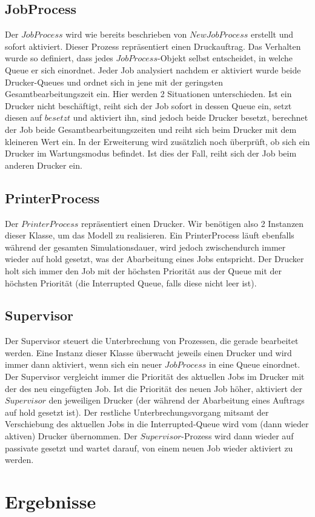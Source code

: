 \documentclass[12pt,a4paper]{article}
\begin{document}
	\subsection{JobProcess}
	Der $JobProcess$ wird wie bereits beschrieben von $NewJobProcess$ erstellt und sofort aktiviert. Dieser Prozess repräsentiert einen Druckauftrag. Das Verhalten wurde so definiert, dass jedes
	$JobProcess$-Objekt selbst entscheidet, in welche Queue er sich einordnet. Jeder Job analysiert nachdem er aktiviert wurde beide Drucker-Queues und ordnet sich in jene mit der geringsten
	Gesamtbearbeitungszeit ein. Hier werden 2 Situationen unterschieden. Ist ein Drucker nicht beschäftigt, reiht sich der Job sofort in dessen Queue ein, setzt diesen auf $besetzt$ und aktiviert ihn, sind 
	jedoch beide Drucker besetzt, berechnet der Job beide Gesamtbearbeitungszeiten und reiht sich beim Drucker mit dem kleineren Wert ein. In der Erweiterung wird zusätzlich noch überprüft, ob sich ein Drucker im			Wartungsmodus befindet. Ist dies der Fall, reiht sich der Job beim anderen Drucker ein.
	
	\subsection{PrinterProcess}
	Der $PrinterProcess$ repräsentiert einen Drucker. Wir benötigen also 2 Instanzen dieser Klasse, um das Modell zu realisieren. Ein PrinterProcess läuft ebenfalls während der gesamten Simulationsdauer, wird
	jedoch zwischendurch immer wieder auf hold gesetzt, was der Abarbeitung eines Jobs entspricht. Der Drucker holt sich immer den Job mit der höchsten Priorität aus der Queue mit der höchsten Priorität (die 			Interrupted Queue, falls diese nicht leer ist).
	
	
	
	\subsection{Supervisor}
	Der Supervisor steuert die Unterbrechung von Prozessen, die gerade bearbeitet werden. Eine Instanz dieser Klasse überwacht jeweils einen Drucker und wird immer dann aktiviert, wenn sich ein 
	neuer $JobProcess$ in eine Queue einordnet. Der Supervisor vergleicht immer die Priorität des aktuellen Jobs im Drucker mit der des neu eingefügten Job. Ist die Priorität des neuen Job höher, aktiviert
	der $Supervisor$ den jeweiligen Drucker (der während der Abarbeitung eines Auftrags auf hold gesetzt ist). Der restliche Unterbrechungsvorgang mitsamt der Verschiebung des aktuellen Jobs in die
	Interrupted-Queue wird vom (dann wieder aktiven) Drucker übernommen. Der $Supervisor$-Prozess wird dann wieder auf passivate gesetzt und wartet darauf, von einem neuen Job wieder aktiviert zu 
	werden.
	
	
	\section{Ergebnisse}
	
	
\end{document}
